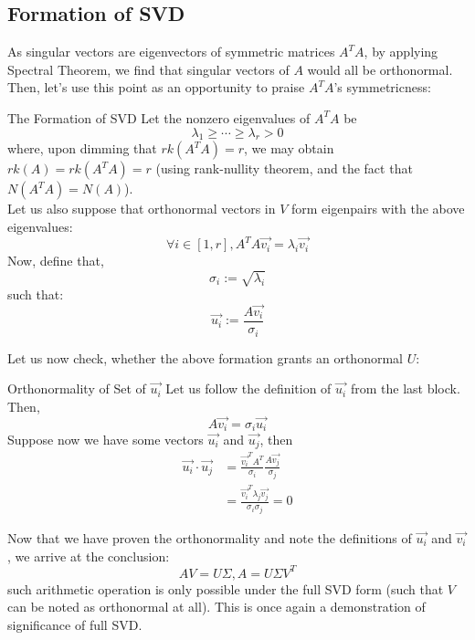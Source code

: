 \subsection{Formation of SVD}
As singular vectors are eigenvectors of symmetric matrices $A^T A$, by applying Spectral Theorem, we find that singular vectors of $A$ would all be orthonormal. \\
Then, let's use this point as an opportunity to praise $A^T A$'s symmetricness:
\begin{ln-theorem}{The Formation of SVD}{}
    Let the nonzero eigenvalues of $A^T A$ be
    \[
        \lambda_1 \geq \cdots \geq \lambda_r > 0
    \]
    where, upon dimming that $rk(A^T A) = r$, we may obtain $rk(A) = rk(A^T A) = r$ (using rank-nullity theorem, and the fact that $N(A^T A) = N(A)$). \\
    Let us also suppose that orthonormal vectors in $V$ form eigenpairs with the above eigenvalues:
    \[
        \forall i \in [1, r], A^T A \vec{v_i} = \lambda_i \vec{v_i}
    \]
    Now, define that,
    \[
        \sigma_i := \sqrt{\lambda_i}
    \]
    such that:
    \[
        \vec{u_i} := \frac{A \vec{v_i}}{\sigma_i}
    \]
\end{ln-theorem}
Let us now check, whether the above formation grants an orthonormal $U$:
\begin{ln-theorem}{Orthonormality of Set of $\vec{u_i}$}{}
    Let us follow the definition of $\vec{u_i}$ from the last block. \\
    Then,
    \[A \vec{v_i} = \sigma_i \vec{u_i}\]
    Suppose now we have some vectors $\vec{u_i}$ and $\vec{u_j}$, then
    \begin{align*}
        \vec{u_i} \cdot \vec{u_j}
        &= \frac{\vec{v_i}^T A^T}{\sigma_i} \frac{A \vec{v_j}}{\sigma_j} \\
        &= \frac{\vec{v_i}^T \lambda_j \vec{v_j}}{\sigma_i \sigma_j} = 0
    \end{align*}
\end{ln-theorem}
Now that we have proven the orthonormality and note the definitions of $\vec{u_i}$ and $\vec{v_i}$, we arrive at the conclusion:
\[
    A V = U \Sigma, A = U \Sigma V^T
\]
such arithmetic operation is only possible under the full SVD form (such that $V$ can be noted as orthonormal at all).
This is once again a demonstration of significance of full SVD.

